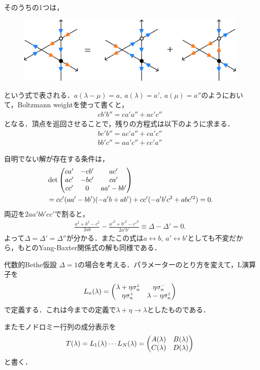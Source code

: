 \documentclass[\main/main.tex]{subfiles}
\begin{document}
\begin{frame}
    そのうちの1つは，
    \begin{figure}[H]
        \centering
        \includegraphics[scale = 0.2]{YBE_abc.pdf}
    \end{figure}
    という式で表される．$a(\lambda-\mu) = a,~ a(\lambda) = a',~ a(\mu) = a''$のようにおいて，Boltzmann weightを使って書くと，
    \begin{align}
        cb'b'' = ca'a'' + ac'c''
    \end{align}
    となる．頂点を巡回させることで，残りの方程式は以下のように求まる．
    \begin{align}
        bc'b'' = ac'a'' + ca'c''\\
        bb'c'' = aa'c'' + cc'a''
    \end{align}
\end{frame}

\begin{frame}{}
    自明でない解が存在する条件は，
    \begin{align*}
        &
        \det \mqty(
            ca' & -cb' & ac' \\
            ac' & -bc' & ca' \\
            cc' & 0    & aa'-bb'
        )
        \\ &
        = cc'(aa'-bb')(-a'b+ab') + cc'(-a'b'c^2+abc'^2)
        = 0.
    \end{align*}
    両辺を$2aa'bb'cc'$で割ると，
    \begin{align}
        \frac{a^2+b^2-c^2}{2ab} - \frac{a'^2+b'^2-c'^2}{2a'b'} \equiv \Delta - \Delta' = 0.
    \end{align}
    よって$\Delta = \Delta' = \Delta''$が分かる．またこの式は$a \leftrightarrow  b,~ a' \leftrightarrow b'$としても不変だから，もとのYang-Baxter関係式の解も同様である．
\end{frame}

\begin{frame}{代数的Bethe仮設}
    $\Delta = 1$の場合を考える．パラメーターのとり方を変えて，L演算子を
    \begin{align}
        L_n(\lambda) = 
        \mqty(
            \lambda + \eta\sigma_n^z & \eta\sigma_n^- \\
            \eta\sigma_n^+ & \lambda - \eta\sigma_n^z
        )
    \end{align}
    で定義する．これは今までの定義で$\lambda + \eta \to \lambda$としたものである．

    またモノドロミー行列の成分表示を
    \begin{align}
        T(\lambda) = L_1(\lambda) \cdots L_N(\lambda) = \mqty(A(\lambda)&B(\lambda)\\C(\lambda)&D(\lambda)) 
    \end{align}
    と書く．
\end{frame}
\end{document}
